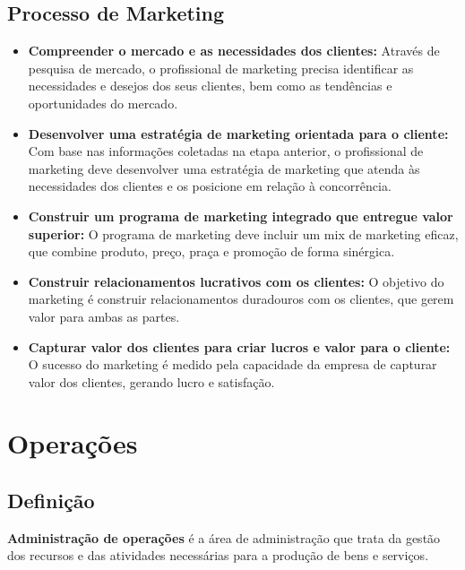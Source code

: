 \documentclass{article}
\begin{document}
\subsection{Processo de Marketing}
\begin{itemize}
    \item \textbf{Compreender o mercado e as necessidades dos clientes:} Através de pesquisa de mercado, o profissional de marketing precisa identificar as necessidades e desejos dos seus clientes, bem como as tendências e oportunidades do mercado.
    \item \textbf{Desenvolver uma estratégia de marketing orientada para o cliente:} Com base nas informações coletadas na etapa anterior, o profissional de marketing deve desenvolver uma estratégia de marketing que atenda às necessidades dos clientes e os posicione em relação à concorrência.
    \item \textbf{Construir um programa de marketing integrado que entregue valor superior:} O programa de marketing deve incluir um mix de marketing eficaz, que combine produto, preço, praça e promoção de forma sinérgica.
    \item \textbf{Construir relacionamentos lucrativos com os clientes:} O objetivo do marketing é construir relacionamentos duradouros com os clientes, que gerem valor para ambas as partes.
    \item \textbf{Capturar valor dos clientes para criar lucros e valor para o cliente:} O sucesso do marketing é medido pela capacidade da empresa de capturar valor dos clientes, gerando lucro e satisfação.
\end{itemize}

\section{Operações}

\subsection{Definição}
\textbf{Administração de operações} é a área de administração que trata da gestão dos recursos e das atividades necessárias para a produção de bens e serviços.
\end{document}
